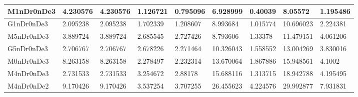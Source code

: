 \documentclass[../thesis.tex]{subfiles}
\begin{document}
\begin{table}[!ht]
\begin{tabular}{|l|l|l|l|l|l|l|l|l|}
        M1nDr0nDe3 & 4.230576 & 4.230576 & 1.126721 & 0.795096 & 6.928999 & 0.40039 & 8.05572 & 1.195486 \\ \hline
        G1nDr0nDe3 & 2.095238 & 2.095238 & 1.702339 & 1.208607 & 8.993684 & 1.015774 & 10.696023 & 2.224381 \\ \hline
        M5nDr0nDe3 & 3.889724 & 3.889724 & 2.685545 & 2.727426 & 8.793606 & 1.33378 & 11.479151 & 4.061206 \\ \hline
        G5nDr0nDe3 & 2.706767 & 2.706767 & 2.678226 & 2.271464 & 10.326043 & 1.558552 & 13.004269 & 3.830016 \\ \hline
        M0nDr0nDe3 & 8.263158 & 8.263158 & 2.278497 & 2.232314 & 13.670064 & 1.867886 & 15.948561 & 4.1002 \\ \hline
        M4nDr0nDe3 & 2.731533 & 2.731533 & 3.254672 & 2.88178 & 15.688116 & 1.313715 & 18.942788 & 4.195495 \\ \hline
        M4nDr0nDe2 & 9.170426 & 9.170426 & 3.537254 & 3.707255 & 26.455623 & 4.224576 & 29.992877 & 7.931831 \\ \hline
    \end{tabular}
\end{table}
\end{document}
